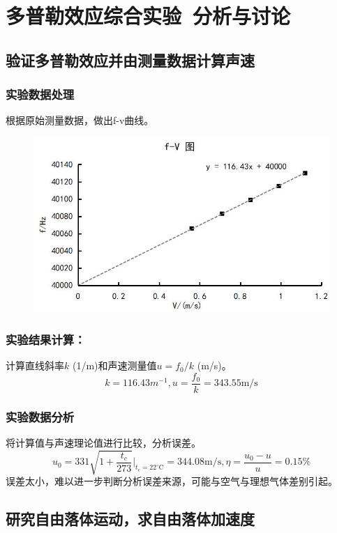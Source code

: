 \documentclass[dvipsnames, svgnames,a4paper,11pt]{article}
\begin{document}
\section{多普勒效应综合实验\ \textbf{分析与讨论}}
\subsection{验证多普勒效应并由测量数据计算声速}
\subsubsection*{实验数据处理}
\noindent 根据原始测量数据，做出f-v曲线。
\begin{figure}[H]
	\centering
	\includegraphics[width=\textwidth]{多普勒fv图png.png}
\end{figure}
\subsubsection*{实验结果计算：}
\noindent 计算直线斜率$k$ (1/m)和声速测量值$u=f_0/k$ (m/s)。\\
$$k=116.43m^{-1},u=\frac{f_0}{k}=343.55\text{m/s}$$
\subsubsection*{实验数据分析}
\noindent 将计算值与声速理论值进行比较，分析误差。\\
$$u_0=331\sqrt{1+\frac{t_c}{273}}|_{t_c=22^\circ\text{C}}=344.08\text{m/s},\eta=\frac{u_0-u}{u}=0.15\%$$
误差太小，难以进一步判断分析误差来源，可能与空气与理想气体差别引起。

\subsection{研究自由落体运动，求自由落体加速度}
\end{document}
